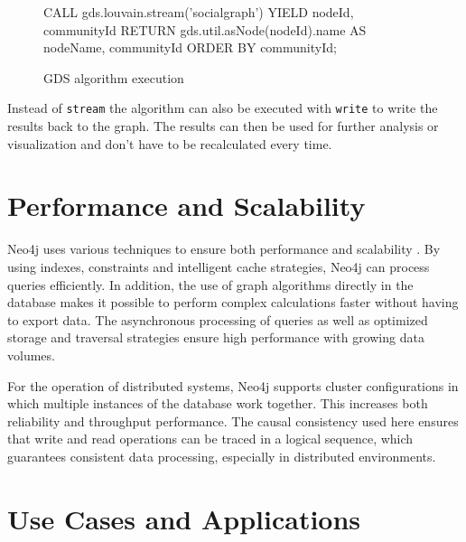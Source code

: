 \documentclass[english,smartquotes,apa]{hgbreport}
\begin{document}
\begin{figure}[h]
	\begin{GenericCode}[numbers=none]
		CALL gds.louvain.stream('socialgraph')
		YIELD nodeId, communityId
		RETURN gds.util.asNode(nodeId).name AS nodeName, communityId
		ORDER BY communityId;
	\end{GenericCode}
	\caption{GDS algorithm execution}
	\label{lst:gds-algorithm}
\end{figure}

Instead of \lstinline{stream} the algorithm can also be executed with \lstinline{write} to write the results back to the graph. The results can then be used for further analysis or visualization and don't have to be recalculated every time.


\section*{Performance and Scalability}

Neo4j uses various techniques to ensure both performance and scalability \parencite{neo4j-operations-manual}.  By using indexes, constraints and intelligent cache strategies, Neo4j can process queries efficiently. In addition, the use of graph algorithms directly in the database makes it possible to perform complex calculations faster without having to export data. The asynchronous processing of queries as well as optimized storage and traversal strategies ensure high performance with growing data volumes.

For the operation of distributed systems, Neo4j supports cluster configurations in which multiple instances of the database work together. This increases both reliability and throughput performance. The causal consistency used here ensures that write and read operations can be traced in a logical sequence, which guarantees consistent data processing, especially in distributed environments.


\section*{Use Cases and Applications}
\end{document}
